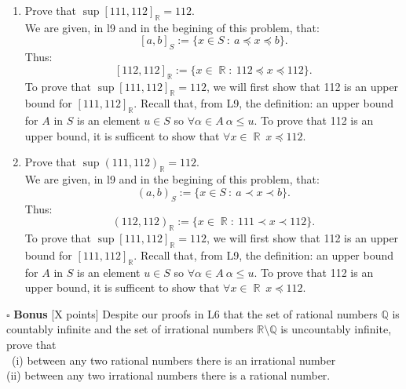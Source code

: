 \documentclass[11pt]{article}
\numberwithin{equation}{section}
\DeclareMathOperator*{\R}{\mathbb{R}}
\DeclareMathOperator*{\+}{\oplus}
\DeclareMathOperator*{\fl}{\prec} %
\begin{document}
  \begin{enumerate}[label= 2.\arabic*, itemsep=0.2cm]
    \item %
      Prove that $\sup [111,112]_{\mathbb{R}} = 112$.\\
      We are given, in l9 and in the begining of this problem, that:  
      $$[a,b]_S := \Big \{ x \in S \ : \ a \preceq x \preceq b \Big \}.$$ 
      Thus: 
      $$[112,112]_{\R} := \Big \{ x\in \R :\ 112 \preceq x \preceq 112 \Big \}.$$ 
      To prove that $\sup [111,112]_{\mathbb{R}} = 112$, we will first show that 112 is an upper bound for $[111,112]_{\mathbb{R}}$.
      Recall that, from L9, the definition: an upper bound for $A$ in $S$ is an element $u \in S$ so $\forall \alpha \in A \ \alpha \leq u$. 
      To prove that 112 is an upper bound, it is sufficent to show that $\forall x \in \R \ x \preceq 112$.
      
    \item %
      Prove that $\sup (111,112)_{\mathbb{R}} = 112$.\\
      We are given, in l9 and in the begining of this problem, that:  
      $$(a,b)_S := \Big \{ x \in S \ : \ a \fl x \fl b \Big \}.$$ 
      Thus: 
      $$(112,112)_{\R} := \Big \{ x\in \R :\ 111 \fl x  \fl 112\Big \}.$$ 
      To prove that $\sup [111,112]_{\mathbb{R}} = 112$, we will first show that 112 is an upper bound for $[111,112]_{\mathbb{R}}$.
      Recall that, from L9, the definition: an upper bound for $A$ in $S$ is an element $u \in S$ so $\forall \alpha \in A \ \alpha \leq u$. 
      To prove that 112 is an upper bound, it is sufficent to show that $\forall x \in \R \ x \preceq 112$.
      

   \end{enumerate}


  

    
\noindent $\square$ \textbf{Bonus} [X points] Despite our proofs in \textsf{L6} that the set of rational numbers $\mathbb{Q}$ is countably infinite and the set of irrational numbers $\mathbb{R} \setminus \mathbb{Q}$ is uncountably infinite, prove that\\
\indent \ (i) between any two rational numbers there is an irrational number\\
\indent (ii) between any two irrational numbers there is a rational number.




 
\end{document}
